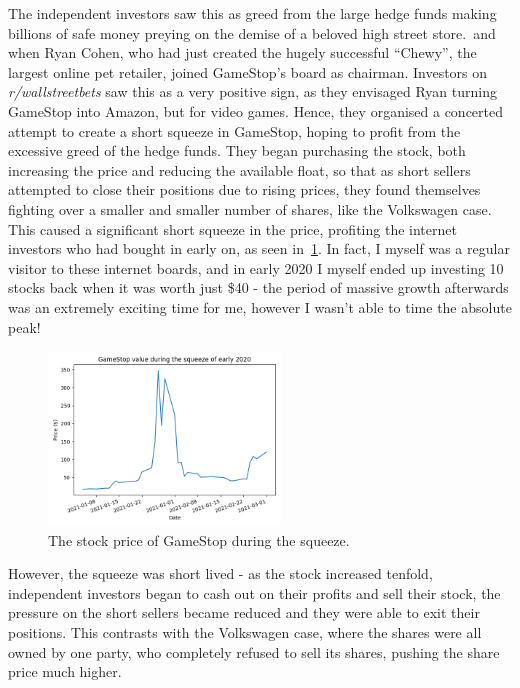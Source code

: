 \documentclass[11pt]{article} %
\begin{document}
The independent investors saw this as greed from the large hedge funds making billions 
of safe money preying on the demise of a beloved high street store.\  and when Ryan Cohen, 
who had just created the hugely successful 
``Chewy'', the largest online pet retailer, joined GameStop's board as chairman. Investors
on \textit{r/wallstreetbets} saw this as a very positive sign, 
as they envisaged Ryan turning GameStop into Amazon, but for video games. Hence, they 
organised a concerted attempt to create a 
short squeeze in GameStop, hoping to profit from the excessive greed of the hedge funds. They 
began purchasing the stock, both increasing the price and reducing the available float, 
so that as short sellers attempted to close their positions due to rising prices, they 
found themselves fighting over a smaller and smaller number of shares, like the 
Volkswagen case. This caused a significant short squeeze in the price, profiting the 
internet investors who had bought in early on, as seen in~\ref{shortsqueeze}. In fact, I myself 
was a regular visitor to these internet boards, and in early 2020 I myself ended up investing 
10 stocks back when it was worth just \$40 - the period of massive growth afterwards was an 
extremely exciting time for me, however I wasn't able to time the absolute peak!
\begin{figure}[h]
    \centering
    \includegraphics[width=0.55\textwidth]{gameStopSqueezeValue.png}
    \caption{The stock price of GameStop during the squeeze.}\label{shortsqueeze}
    \end{figure}
However, the squeeze was short lived - as the stock increased tenfold, independent 
investors began to cash out on their profits and sell their stock, the pressure 
on the short sellers became reduced and they were able to exit their positions. 
This contrasts with the Volkswagen case, where the shares were all owned by one 
party, who completely refused to sell its shares, pushing the share price much higher. 
\end{document}
